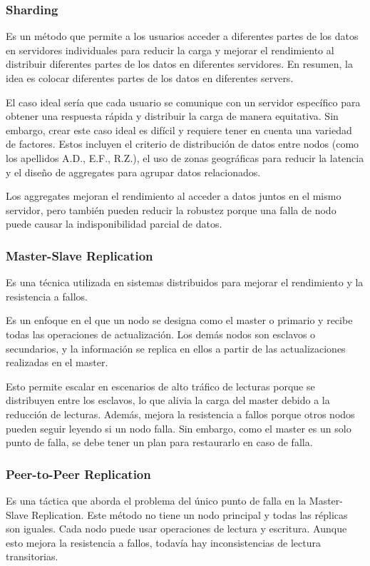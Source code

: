 \documentclass{article}
\begin{document}
		\subsubsection{Sharding}
		Es un método que permite a los usuarios acceder a diferentes partes de los datos en servidores individuales para reducir la carga y mejorar el rendimiento al distribuir diferentes partes de los datos en diferentes servidores. En resumen, la idea es colocar diferentes partes de los datos en diferentes servers.
		
		El caso ideal sería que cada usuario se comunique con un servidor específico para obtener una respuesta rápida y distribuir la carga de manera equitativa. Sin embargo, crear este caso ideal es difícil y requiere tener en cuenta una variedad de factores. Estos incluyen el criterio de distribución de datos entre nodos (como los apellidos A.D., E.F., R.Z.), el uso de zonas geográficas para reducir la latencia y el diseño de aggregates para agrupar datos relacionados.
		
		Los aggregates mejoran el rendimiento al acceder a datos juntos en el mismo servidor, pero también pueden reducir la robustez porque una falla de nodo puede causar la indisponibilidad parcial de datos.
		
		
		\subsubsection{Master-Slave Replication}
		Es una técnica utilizada en sistemas distribuidos para mejorar el rendimiento y la resistencia a fallos.
		
		Es un enfoque en el que un nodo se designa como el master o primario y recibe todas las operaciones de actualización. Los demás nodos son esclavos o secundarios, y la información se replica en ellos a partir de las actualizaciones realizadas en el master.
		
		Esto permite escalar en escenarios de alto tráfico de lecturas porque se distribuyen entre los esclavos, lo que alivia la carga del master debido a la reducción de lecturas. Además, mejora la resistencia a fallos porque otros nodos pueden seguir leyendo si un nodo falla. Sin embargo, como el master es un solo punto de falla, se debe tener un plan para restaurarlo en caso de falla.
		
		\subsubsection{Peer-to-Peer Replication}
		Es una táctica que aborda el problema del único punto de falla en la Master-Slave Replication. Este método no tiene un nodo principal y todas las réplicas son iguales. Cada nodo puede usar operaciones de lectura y escritura. Aunque esto mejora la resistencia a fallos, todavía hay inconsistencias de lectura transitorias.
		
\end{document}
